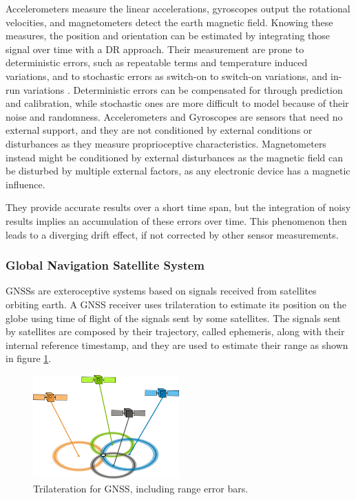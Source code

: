 Accelerometers measure the linear accelerations, gyroscopes output the rotational velocities, and magnetometers detect the earth magnetic field.
Knowing these measures, the position and orientation can be estimated by integrating those signal over time with a \gls{DR} approach.
Their measurement are prone to deterministic errors, such as repeatable terms and temperature induced variations, and to stochastic errors as switch-on to switch-on variations, and in-run variations \cite{magnusson_improving_2012}.
Deterministic errors can be compensated for through prediction and calibration, while stochastic ones are more difficult to model because of their noise and randomness.
Accelerometers and Gyroscopes are sensors that need no external support, and they are not conditioned by external conditions or disturbances as they measure proprioceptive characteristics.
Magnetometers instead might be conditioned by external disturbances as the magnetic field can be disturbed by multiple external factors, as any electronic device has a magnetic influence.

They provide accurate results over a short time span, but the integration of noisy results implies an accumulation of these errors over time. This phenomenon then leads to a diverging drift effect, if not corrected by other sensor measurements.


\subsubsection{Global Navigation Satellite System}

\noindent \glspl{GNSS} are exteroceptive systems based on signals received from satellites orbiting earth.
A \gls{GNSS} receiver uses trilateration to estimate its position on the globe using time of flight of the signals sent by some satellites.
The signals sent by satellites are composed by their trajectory, called ephemeris, along with their internal reference timestamp, and they are used to estimate their range as shown in figure \ref{fig:gps}.
\begin{figure}[!ht]
  \begin{center}
    \includegraphics[width=0.5\textwidth]{Images/2-Background/GPS.png}
  \end{center}
  \caption{Trilateration for \Gls{GNSS}, including range error bars.}
  \label{fig:gps}
\end{figure}


